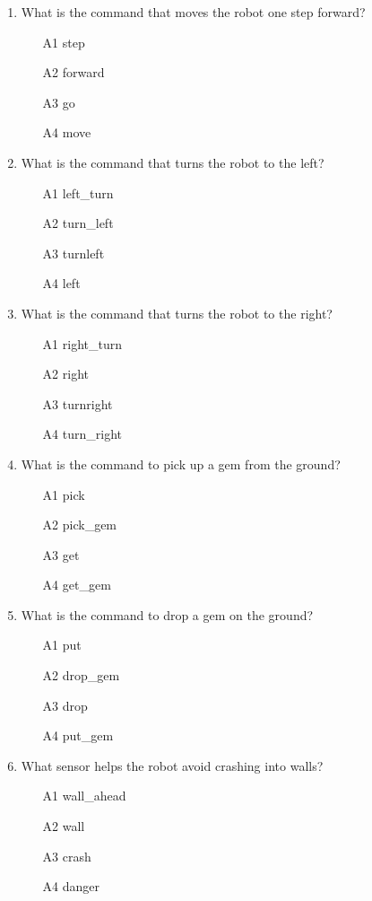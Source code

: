 \begin{enumerate}
\item What is the command that moves the robot one step forward?
\begin{enumerate}
\item[A1] step
\item[A2] forward
\item[A3] go
\item[A4] move
\end{enumerate}
\item What is the command that turns the robot to the left?
\begin{enumerate}
\item[A1] left\_turn
\item[A2] turn\_left
\item[A3] turnleft
\item[A4] left
\end{enumerate}
\item What is the command that turns the robot to the right?
\begin{enumerate}
\item[A1] right\_turn
\item[A2] right
\item[A3] turnright
\item[A4] turn\_right
\end{enumerate}
\item What is the command to pick up a gem from the ground?
\begin{enumerate}
\item[A1] pick
\item[A2] pick\_gem
\item[A3] get
\item[A4] get\_gem
\end{enumerate}
\item What is the command to drop a gem on the ground?
\begin{enumerate}
\item[A1] put
\item[A2] drop\_gem
\item[A3] drop 
\item[A4] put\_gem
\end{enumerate}
\item What sensor helps the robot avoid crashing into walls?
\begin{enumerate}
\item[A1] wall\_ahead
\item[A2] wall
\item[A3] crash
\item[A4] danger

\end{enumerate}
\end{enumerate}
